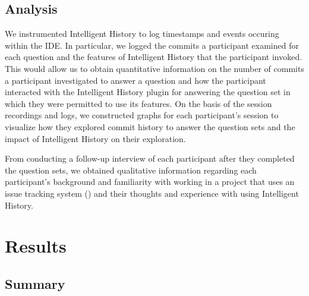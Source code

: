 \subsection{Analysis}

We instrumented Intelligent History to log timestamps and events occuring within the IDE.
In particular, we logged the commits a participant examined for each question and the features of Intelligent History that the participant invoked.
This would allow us to obtain quantitative information on the number of commits a participant investigated to answer a question and how the participant interacted with the Intelligent History plugin for answering the question set in which they were permitted to use its features.
On the basis of the session recordings and logs, we constructed graphs for each participant's session to visualize how they explored commit history to answer the question sets and the impact of Intelligent History on their exploration.

From conducting a follow-up interview of each participant after they completed the question sets, we obtained qualitative information regarding each participant's background and familiarity with working in a project that uses an issue tracking system () and their thoughts and experience with using Intelligent History.

\section{Results}
\label{sec:Results}

\subsection{Summary}


